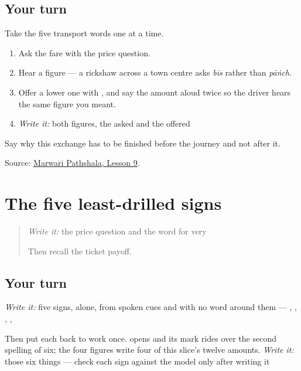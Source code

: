 \subsection*{Your turn}
Take the five transport words one at a time.

\begin{enumerate}
\raggedright
  \item Ask the fare with the price question.
  \item Hear a figure — a rickshaw across a town centre asks \emph{bīs} rather than \emph{pāṅch}.
  \item Offer a lower one with \textbf{}, and say the amount aloud twice so the driver hears the same figure you meant.
  \item \emph{Write it:} both figures, the asked and the offered
\end{enumerate}

Say why this exchange has to be finished before the journey and not after it.

\begin{tcolorbox}[breakable,colback=teal!4,colframe=teal!35!black,title={Before you move on}]
Source: \href{https://www.marwaripathshala.com/marwari-lesson-9-english}{Marwari Pathshala, Lesson 9}.
\end{tcolorbox}
\section[Practice]{The five least-drilled signs}

\label{lesson:MW-R36-letters-close}



\begin{quote}
\emph{Write it:} the price question and the word for very

Then recall the ticket payoff.
\end{quote}

\subsection*{Your turn}
\emph{Write it:} five signs, alone, from spoken cues and with no word around them — \textbf{}, \textbf{}, \textbf{}, \textbf{}, \textbf{}

Then put each back to work once. \textbf{} opens \textbf{} and its mark rides over the second spelling of six; the four figures write four of this slice's twelve amounts. \emph{Write it:} those six things — check each sign against the model only after writing it

